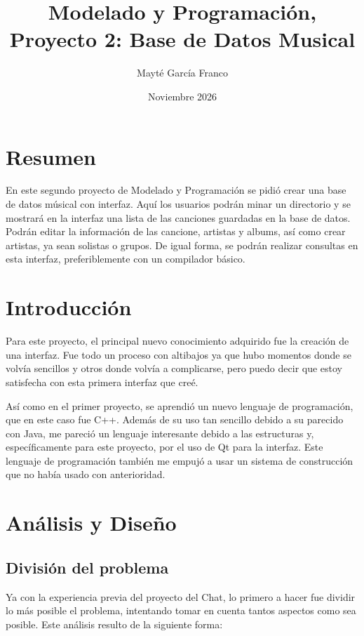 \documentclass{article}
\title{Modelado y Programación, Proyecto 2: Base de Datos Musical}
\author{Mayté García Franco}
\date{Noviembre 2026}
\begin{document}
\maketitle

\section{Resumen}

En este segundo proyecto de Modelado y Programación se pidió crear una base de datos músical con interfaz. Aquí los usuarios podrán minar un directorio y se mostrará en la interfaz una lista de las canciones guardadas en la base de datos. Podrán editar la información de las cancione, artistas y albums, así como crear artistas, ya sean solistas o grupos. De igual forma, se podrán realizar consultas en esta interfaz, preferiblemente con un compilador básico. 

\section{Introducción}

Para este proyecto, el principal nuevo conocimiento adquirido fue la creación de una interfaz. Fue todo un proceso con altibajos ya que hubo momentos donde se volvía sencillos y otros donde volvía a complicarse, pero puedo decir que estoy satisfecha con esta primera interfaz que creé.

Así como en el primer proyecto, se aprendió un nuevo lenguaje de programación, que en este caso fue C++. Además de su uso tan sencillo debido a su parecido con Java, me pareció un lenguaje interesante debido a las estructuras y, específicamente para este proyecto, por el uso de Qt para la interfaz. Este lenguaje de programación también me empujó a usar un sistema de construcción que no había usado con anterioridad.

\section{Análisis y Diseño}

\subsection{División del problema}

Ya con la experiencia previa del proyecto del Chat, lo primero a hacer fue dividir lo más posible el problema, intentando tomar en cuenta tantos aspectos como sea posible. Este análisis resulto de la siguiente forma: 
\end{document}
